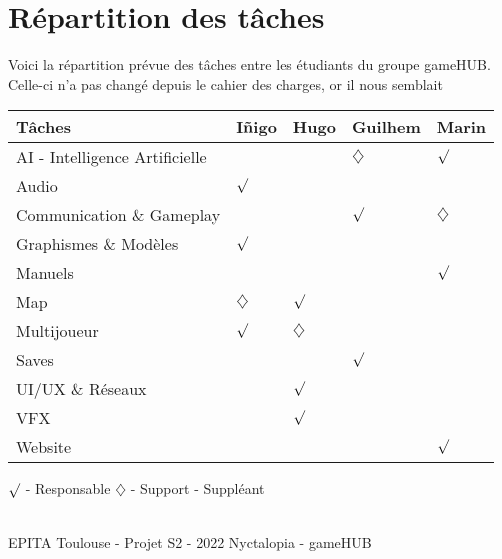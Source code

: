 \section{Répartition des tâches}
\noindent Voici la répartition prévue des tâches entre les étudiants du groupe gameHUB. Celle-ci n'a pas changé depuis le cahier des charges, or il nous semblait 


\begin{center}
\begin{tabular}{|l|l|l|l|l|}
\hline
Tâches                         & Iñigo & Hugo        & Guilhem & Marin \\ \hline
AI - Intelligence Artificielle &       &             & $\diamondsuit$        & $\surd$  \\ \hline
Audio                          & $\surd$  &             &         &       \\ \hline
Communication \& Gameplay                       &       &             & $\surd$    & $\diamondsuit$      \\ \hline
Graphismes \& Modèles          & $\surd$  &             &         &       \\ \hline
Manuels                        &       &             &         & $\surd$  \\ \hline
Map                            & $\diamondsuit$ & $\surd$        &         &       \\ \hline
Multijoueur                    & $\surd$  & $\diamondsuit$ &         &       \\ \hline
Saves                          &       &             & $\surd$    &       \\ \hline
UI/UX \& Réseaux             &       & $\surd$        &         &       \\ \hline
VFX                            &       & $\surd$        &         &       \\ \hline
Website                        &       &  &         & $\surd$  \\ \hline
\end{tabular}
\end{center}

\noindent $\surd$ - Responsable
\newline
$\diamondsuit$ - Support - Suppléant

\vfill
\noindent\makebox[\linewidth]{\rule{.8\paperwidth}{.6pt}}\\[0.2cm]
EPITA Toulouse - Projet S2 - 2022 \hfill Nyctalopia - gameHUB
\noindent\makebox[\linewidth]{\rule{.8\paperwidth}{.6pt}}